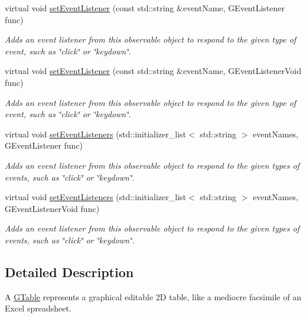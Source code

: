 \begin{DoxyCompactItemize}
virtual void \mbox{\hyperlink{classGObservable_ad2f6d34961c50f6c1e0659990b79f741}{set\+Event\+Listener}} (const std\+::string \&event\+Name, G\+Event\+Listener func)
\begin{DoxyCompactList}\small\item\em Adds an event listener from this observable object to respond to the given type of event, such as \char`\"{}click\char`\"{} or \char`\"{}keydown\char`\"{}. \end{DoxyCompactList}\item 
virtual void \mbox{\hyperlink{classGObservable_abac4cb9f9e626e010e87f5d91573c8a5}{set\+Event\+Listener}} (const std\+::string \&event\+Name, G\+Event\+Listener\+Void func)
\begin{DoxyCompactList}\small\item\em Adds an event listener from this observable object to respond to the given type of event, such as \char`\"{}click\char`\"{} or \char`\"{}keydown\char`\"{}. \end{DoxyCompactList}\item 
virtual void \mbox{\hyperlink{classGObservable_afa388d69c33c718cf035774604065604}{set\+Event\+Listeners}} (std\+::initializer\+\_\+list$<$ std\+::string $>$ event\+Names, G\+Event\+Listener func)
\begin{DoxyCompactList}\small\item\em Adds an event listener from this observable object to respond to the given types of events, such as \char`\"{}click\char`\"{} or \char`\"{}keydown\char`\"{}. \end{DoxyCompactList}\item 
virtual void \mbox{\hyperlink{classGObservable_a7867184bbb686f74fae8a4db927da799}{set\+Event\+Listeners}} (std\+::initializer\+\_\+list$<$ std\+::string $>$ event\+Names, G\+Event\+Listener\+Void func)
\begin{DoxyCompactList}\small\item\em Adds an event listener from this observable object to respond to the given types of events, such as \char`\"{}click\char`\"{} or \char`\"{}keydown\char`\"{}. \end{DoxyCompactList}\end{DoxyCompactItemize}


\subsection{Detailed Description}
A \mbox{\hyperlink{classGTable}{G\+Table}} represents a graphical editable 2D table, like a mediocre facsimile of an Excel spreadsheet. 

